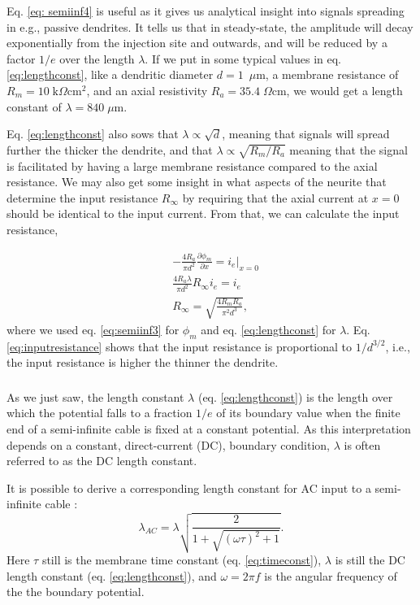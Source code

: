Eq. \ref{eq: semiinf4} is useful as it gives us analytical insight into signals spreading in e.g., passive dendrites. It tells us that in steady-state, the amplitude will decay exponentially from the injection site and outwards, and will be reduced by a factor $1/e$ over the length $\lambda$. If we put in some typical values in eq. \ref{eq:lengthconst}, like a dendritic diameter $d=1$~$\mu$m, a membrane resistance of $R_m=10\;\text{k}\Omega\text{cm}^2$, and an axial resistivity $R_a=35.4\;\Omega\text{cm}$, we would get a length constant of $\lambda = 840\; \mu$m. 

Eq. \ref{eq:lengthconst} also sows that $\lambda \propto \sqrt{d}$, meaning that signals will spread further the thicker the dendrite, and that $\lambda \propto \sqrt{R_m/R_a}$ meaning that the signal is facilitated by having a large membrane resistance compared to the axial resistance. We may also get some insight in what aspects of the neurite that determine the input resistance $R_{\infty}$ by requiring that the axial current at $x=0$ should be identical to the input current. From that, we can calculate the input resistance, 

\begin{align}
&- \frac{4R_a}{\pi d^2} \frac{\partial \phi_m}{\partial x}  = i_e  \Big|_{x=0} \\
&\frac{4R_a \lambda}{\pi d^2} R_{\infty} i_e  = i_e \\
&R_{\infty} =  \sqrt{\frac{4R_m R_a}{\pi^2 d^3}}, 
\label{eq:inputresistance}
\end{align}
where we used eq. \ref{eq:semiinf3} for $\phi_m$ and eq. \ref{eq:lengthconst} for $\lambda$. Eq. \ref{eq:inputresistance} shows that the input resistance is proportional to $1/d^{3/2}$, i.e., the input resistance is higher the thinner the dendrite. 


\subsubsection{}
As we just saw, the length constant $\lambda$ (eq. \ref{eq:lengthconst}) is the length over which the potential falls to a fraction $1/e$ of its boundary value when the finite end of a semi-infinite cable is fixed at a constant potential. As this interpretation depends on a constant, direct-current (DC), boundary condition, $\lambda$ is often referred to as the DC length constant. 

It is possible to derive a corresponding length constant for AC input to a semi-infinite cable \cite{Pettersen2008a}: 
\begin{equation}
\lambda_{AC} = \lambda \sqrt{ \frac{2}{1+\sqrt{(\omega \tau)^2 + 1}} }.
\label{eq:AClambda}
\end{equation}
Here $\tau$ still is the membrane time constant (eq. \ref{eq:timeconst}), $\lambda$ is still the DC length constant (eq. \ref{eq:lengthconst}), and $\omega = 2\pi f$ is the angular frequency of the the boundary potential.


